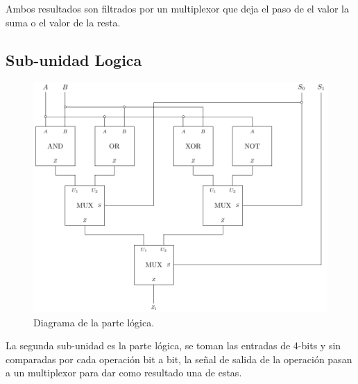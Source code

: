 \documentclass[journal, table]{IEEEtran}
\begin{document}
Ambos resultados son filtrados por un multiplexor que deja el paso de el valor la suma o el valor de la resta.

\subsection{Sub-unidad Logica}
\begin{figure}[h]
    \centering
    \includegraphics[width=\linewidth]{./Images/logik.pdf}
    \caption{Diagrama de la parte lógica.}
    \label{fig:logic-diagram}
\end{figure}

La segunda sub-unidad es la parte lógica, se toman las entradas de 4-bits y sin comparadas por cada operación bit a bit, la señal de salida de la operación pasan a un multiplexor para dar como resultado una de estas.
\end{document}
